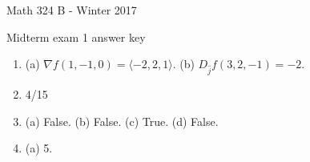 \documentclass[12 pt]{report}
\begin{document}
\noindent \vfill \noindent 

\centerline{Math 324 B  - Winter 2017}

\centerline{Midterm exam 1 answer key}

\begin{enumerate} \item (a) $\nabla f(1,-1,0) = \langle -2, 2, 1 \rangle.$ (b) $D_{\hat{j}}f(3,2,-1) = -2. $

\item 4/15

\item (a) False. (b) False. (c) True. (d) False. 

\item (a) 5.

\end{enumerate}
\end{document}
